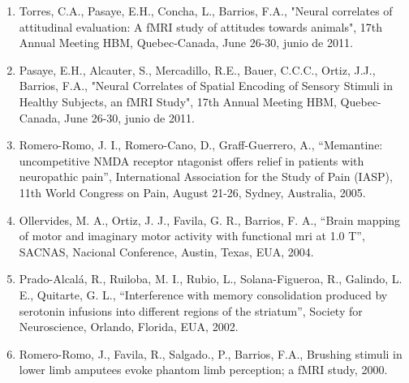 \begin{enumerate}
\item  Torres, C.A., Pasaye, E.H., Concha, L., Barrios, F.A., "Neural correlates of attitudinal evaluation: A fMRI study of 
attitudes towards animals", 17th Annual Meeting HBM, Quebec-Canada, June 26-30, junio 
de 2011.

\item  Pasaye, E.H., Alcauter, S., Mercadillo, R.E., Bauer, C.C.C., Ortiz, J.J., Barrios, F.A., "Neural Correlates of Spatial 
Encoding of Sensory Stimuli in Healthy Subjects, an fMRI Study", 17th Annual Meeting HBM, Quebec-Canada, June 26-30, junio de 
2011.

\item  Romero-Romo, J. I., Romero-Cano, D., Graff-Guerrero, A., “Memantine: uncompetitive NMDA receptor ntagonist offers 
relief 
in patients with neuropathic pain”, International Association for the Study of Pain (IASP), 11th World Congress on Pain, 
August 21-26, Sydney, Australia, 2005.

\item  Ollervides, M. A., Ortiz, J. J., Favila, G. R., Barrios, F. A., “Brain mapping of motor and imaginary motor activity 
with 
functional mri at 1.0 T”, SACNAS, Nacional Conference, Austin, Texas, EUA, 2004.

\item  Prado-Alcalá, R., Ruiloba, M. I., Rubio, L., Solana-Figueroa, R., Galindo, L. E., Quitarte, G. L., “Interference with 
memory consolidation produced by serotonin infusions into different regions of the striatum”, Society for Neuroscience, 
Orlando, Florida, EUA, 2002.

\item  Romero-Romo, J., Favila, R., Salgado., P., Barrios, F.A., Brushing stimuli in lower limb amputees evoke phantom limb 
perception; a fMRI study, 2000.

\end{enumerate}
